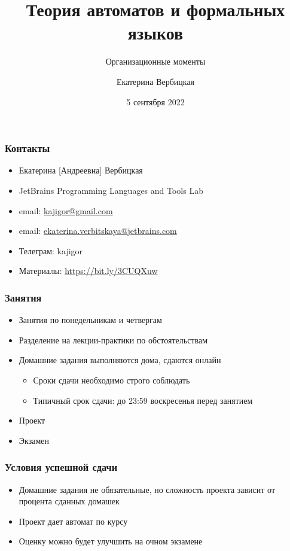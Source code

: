 \documentclass{beamer}
\title[]{Теория автоматов и формальных языков}
\subtitle[]{Организационные моменты}
\institute[]{
НИУ-ВШЭ\\
}
\author[]{Екатерина Вербицкая}
\date{5 сентября 2022}
\begin{document}
{
\begin{frame}
  \titlepage
\end{frame}

}

\begin{frame}[fragile]
  \transwipe[direction=90]
  \frametitle{Контакты}
  \begin{itemize}
    \item Екатерина [Андреевна] Вербицкая
    \item JetBrains Programming Languages and Tools Lab
    \item email: \href{mailto:kajigor@gmail.com}{kajigor@gmail.com}
    \item email: \href{mailto:ekaterina.verbitskaya@jetbrains.com}{ekaterina.verbitskaya@jetbrains.com}
    \item Телеграм: kajigor
    \item Материалы: \url{https://bit.ly/3CUQXuw}
  \end{itemize}
\end{frame}

\begin{frame}[fragile]
  \transwipe[direction=90]
  \frametitle{Занятия}
  \begin{itemize}
    \item Занятия по понедельникам и четвергам
    \item Разделение на лекции-практики по обстоятельствам
    \item Домашние задания выполняются дома, сдаются онлайн
    \begin{itemize}
      \item Сроки сдачи необходимо строго соблюдать
      \item Типичный срок сдачи: до 23:59 воскресенья перед занятием
    \end{itemize}
    \item Проект
    \item Экзамен
  \end{itemize}
\end{frame}

\begin{frame}[fragile]
  \transwipe[direction=90]
  \frametitle{Условия успешной сдачи}
  \begin{itemize}
    \item Домашние задания не обязательные, но сложность проекта зависит от процента сданных домашек
    \item Проект дает автомат по курсу
  \end{itemize}
  \begin{itemize}
    \item Оценку можно будет улучшить на очном экзамене
  \end{itemize}
\end{frame}
\end{document}
